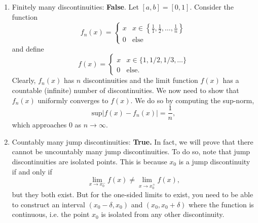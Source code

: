 \documentclass{article}
\numberwithin{equation}{section}
\begin{document}
\begin{enumerate}
\begin{enumerate}[label=(\alph*)]
        \item Finitely many discontinuities: \textbf{False}. Let $[a,b]=[0,1].$ Consider the function 
        \begin{equation}
            f_n(x) = \begin{cases}
                x & x \in \left\{\frac{1}{1},\frac{1}{2},\ldots,\frac{1}{n}\right\} \\
                0 & \text{else}
            \end{cases}
        \end{equation}
        and define 
        \begin{equation}
            f(x) = \begin{cases}
                x & x \in \{1,1/2,1/3,\dots\} \\ 
                0 & \text{else}.
            \end{cases}
        \end{equation}
        Clearly, $f_n(x)$ has $n$ discontinuities and the limit function $f(x)$ has a countable (infinite) number of discontinuities. We now need to show that $f_n(x)$ uniformly converges to $f(x).$ We do so by computing the sup-norm,
        \begin{equation}
            \text{sup}|f(x)-f_n(x)| = \frac{1}{n},
        \end{equation}
        which approaches $0$ as $n \to \infty.$
        \item Countably many jump discontinuities: \textbf{True.} In fact, we will prove that there cannot be uncountably many jump discontinuities. To do so, note that jump discontinuities are isolated points. This is because $x_0$ is a jump discontinuity if and only if 
        \begin{equation}
            \lim_{x\to x_0^-}f(x) \neq \lim_{x\to x_0^+}f(x),
        \end{equation}
        but they both exist. But for the one-sided limits to exist, you need to be able to construct an interval $(x_0-\delta,x_0)$ and $(x_0,x_0+\delta)$ where the function is continuous, i.e. the point $x_0$ is isolated from any other discontinuity.


\end{enumerate}
\end{enumerate}
\end{document}
